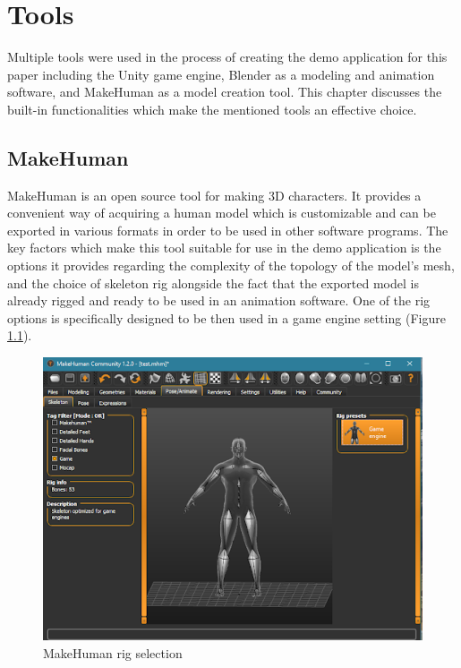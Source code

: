 \chapter{Tools} 
Multiple tools were used in the process of creating the demo application for
this paper including the Unity game engine, Blender as a modeling and animation
software, and MakeHuman as a model creation tool. This chapter discusses the
built-in functionalities which make the mentioned tools an effective choice.

\section{MakeHuman}
MakeHuman is an open source tool for making 3D characters. It provides
a convenient way of acquiring a human model which is customizable and can be
exported in various formats in order to be used in other software programs. The
key factors which make this tool suitable for use in the demo application is the
options it provides regarding the complexity of the topology of the model's
mesh, and the choice of skeleton rig alongside the fact that the exported model
is already rigged and ready to be used in an animation software. One of the rig
options is specifically designed to be then used in a game engine setting
(Figure \ref{fig:mh_rig}).

\begin{figure}
    \centering
    \includegraphics[width=\textwidth]{grafika/make_human_rig.png}
    \caption{MakeHuman rig selection}
    \label{fig:mh_rig}
\end{figure}

